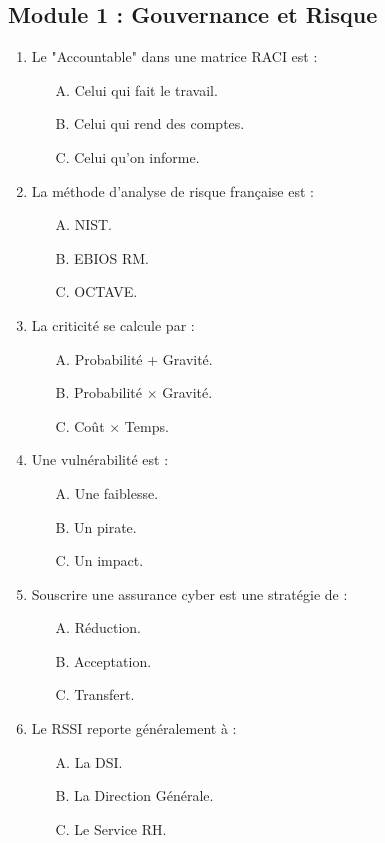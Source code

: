 \subsection*{Module 1 : Gouvernance et Risque}
\begin{enumerate}
    \item Le "Accountable" dans une matrice RACI est :
    \begin{itemize} \item[A.] Celui qui fait le travail. \item[B.] Celui qui rend des comptes. \item[C.] Celui qu'on informe. \end{itemize}
    \item La méthode d'analyse de risque française est :
    \begin{itemize} \item[A.] NIST. \item[B.] EBIOS RM. \item[C.] OCTAVE. \end{itemize}
    \item La criticité se calcule par :
    \begin{itemize} \item[A.] Probabilité + Gravité. \item[B.] Probabilité $\times$ Gravité. \item[C.] Coût $\times$ Temps. \end{itemize}
    \item Une vulnérabilité est :
    \begin{itemize} \item[A.] Une faiblesse. \item[B.] Un pirate. \item[C.] Un impact. \end{itemize}
    \item Souscrire une assurance cyber est une stratégie de :
    \begin{itemize} \item[A.] Réduction. \item[B.] Acceptation. \item[C.] Transfert. \end{itemize}
    \item Le RSSI reporte généralement à :
    \begin{itemize} \item[A.] La DSI. \item[B.] La Direction Générale. \item[C.] Le Service RH. \end{itemize}

\end{enumerate}
